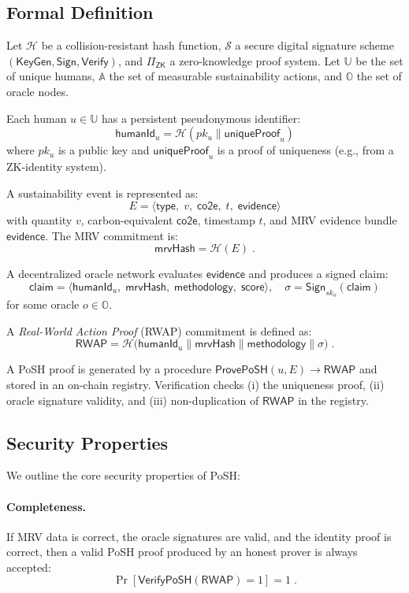 \documentclass[11pt,a4paper]{report}
\theoremstyle{definition}
\theoremstyle{remark}
\begin{document}
\subsection{Formal Definition}

Let \(\mathcal{H}\) be a collision-resistant hash function, \(\mathcal{S}\) a
secure digital signature scheme \((\textsf{KeyGen},\textsf{Sign},\textsf{Verify})\),
and \(\Pi_{\textsf{ZK}}\) a zero-knowledge proof system. Let \(\mathbb{U}\) be
the set of unique humans, \(\mathbb{A}\) the set of measurable sustainability
actions, and \(\mathbb{O}\) the set of oracle nodes.

Each human \(u \in \mathbb{U}\) has a persistent pseudonymous identifier:
\[
  \mathsf{humanId}_u = \mathcal{H}(pk_u \parallel \mathsf{uniqueProof}_u)
\]
where \(pk_u\) is a public key and \(\mathsf{uniqueProof}_u\) is a proof of
uniqueness (e.g., from a ZK-identity system).

A sustainability event is represented as:
\[
  E = \langle \mathsf{type},\; v,\; \mathsf{co2e},\; t,\; \mathsf{evidence} \rangle
\]
with quantity \(v\), carbon-equivalent \(\mathsf{co2e}\), timestamp \(t\), and
MRV evidence bundle \(\mathsf{evidence}\). The MRV commitment is:
\[
  \mathsf{mrvHash} = \mathcal{H}(E) \; .
\]

A decentralized oracle network evaluates \(\mathsf{evidence}\) and produces a
signed claim:
\[
  \mathsf{claim} = \langle \mathsf{humanId}_u,\; \mathsf{mrvHash},\;
  \mathsf{methodology},\; \mathsf{score} \rangle , \quad
  \sigma = \textsf{Sign}_{sk_o}(\mathsf{claim})
\]
for some oracle \(o \in \mathbb{O}\).

A \emph{Real-World Action Proof} (RWAP) commitment is defined as:
\[
  \mathsf{RWAP} =
  \mathcal{H}\big(
    \mathsf{humanId}_u \parallel
    \mathsf{mrvHash} \parallel
    \mathsf{methodology} \parallel
    \sigma
  \big) \; .
\]

A PoSH proof is generated by a procedure
\(\textsf{ProvePoSH}(u,E) \rightarrow \mathsf{RWAP}\) and stored in an on-chain
registry. Verification checks (i) the uniqueness proof, (ii) oracle signature
validity, and (iii) non-duplication of \(\mathsf{RWAP}\) in the registry.

\subsection{Security Properties}

We outline the core security properties of PoSH:

\paragraph{Completeness.}
If MRV data is correct, the oracle signatures are valid, and the identity proof
is correct, then a valid PoSH proof produced by an honest prover is always
accepted:
\[
  \Pr[\textsf{VerifyPoSH}(\mathsf{RWAP}) = 1] = 1 \; .
\]
\end{document}

